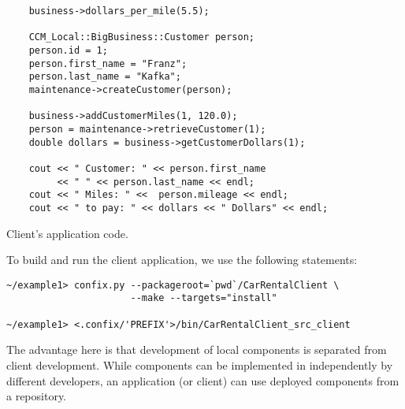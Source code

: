 \begin{Example}
\begin{minifbox}
\begin{small}
\begin{verbatim}
    business->dollars_per_mile(5.5);
    
    CCM_Local::BigBusiness::Customer person;
    person.id = 1;
    person.first_name = "Franz";
    person.last_name = "Kafka";
    maintenance->createCustomer(person);

    business->addCustomerMiles(1, 120.0); 
    person = maintenance->retrieveCustomer(1);
    double dollars = business->getCustomerDollars(1); 

    cout << " Customer: " << person.first_name 
         << " " << person.last_name << endl;
    cout << " Miles: " <<  person.mileage << endl;
    cout << " to pay: " << dollars << " Dollars" << endl;
\end{verbatim}
\end{small}
\end{minifbox}
\caption{Client's application code.}
\label{example:ClientApplication}
\end{Example}

To build and run the client application, we use the following statements:
\begin{small}
\begin{verbatim}
~/example1> confix.py --packageroot=`pwd`/CarRentalClient \
                      --make --targets="install"

~/example1> <.confix/'PREFIX'>/bin/CarRentalClient_src_client
\end{verbatim}
\end{small}


The advantage here is that development of local components is separated from
client development. 
While components can be implemented in independently by different developers, an
application (or client) can use deployed components from a repository.

